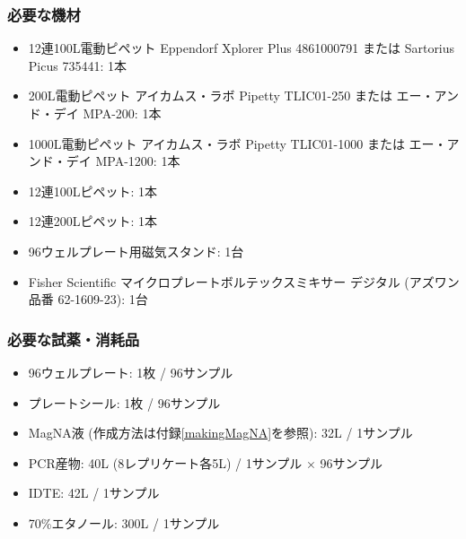 \documentclass[titlepage,10pt,a4paper]{jsbook}
\begin{document}
\subsubsection{必要な機材}
\begin{itemize}
\item 12連100{\textmu}L電動ピペット Eppendorf Xplorer Plus 4861000791 または Sartorius Picus 735441: 1本
\item 200{\textmu}L電動ピペット アイカムス・ラボ Pipetty TLIC01-250 または エー・アンド・デイ MPA-200: 1本
\item 1000{\textmu}L電動ピペット アイカムス・ラボ Pipetty TLIC01-1000 または エー・アンド・デイ MPA-1200: 1本
\item 12連100{\textmu}Lピペット: 1本
\item 12連200{\textmu}Lピペット: 1本
\item 96ウェルプレート用磁気スタンド: 1台
\item Fisher Scientific マイクロプレートボルテックスミキサー デジタル (アズワン品番 62-1609-23): 1台
\end{itemize}

\subsubsection{必要な試薬・消耗品}
\begin{itemize}
\item 96ウェルプレート: 1枚 / 96サンプル
\item プレートシール: 1枚 / 96サンプル
\item MagNA液 (作成方法は付録\ref{makingMagNA}を参照): 32{\textmu}L / 1サンプル
\item PCR産物: 40{\textmu}L (8レプリケート各5{\textmu}L) / 1サンプル × 96サンプル
\item IDTE: 42{\textmu}L / 1サンプル
\item 70\%エタノール: 300{\textmu}L / 1サンプル
\end{itemize}
\end{document}
